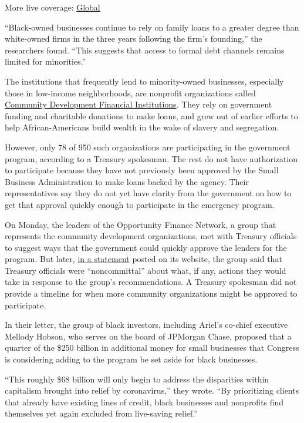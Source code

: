 More live coverage:
\href{https://www.nytimes.com/2020/08/03/world/coronavirus-covid-19.html?action=click\&pgtype=Article\&state=default\&region=MAIN_CONTENT_1\&context=storylines_live_updates}{Global}

``Black-owned businesses continue to rely on family loans to a greater
degree than white-owned firms in the three years following the firm's
founding,'' the researchers found. ``This suggests that access to formal
debt channels remains limited for minorities.''

The institutions that frequently lend to minority-owned businesses,
especially those in low-income neighborhoods, are nonprofit
organizations called
\href{https://www.nytimes.com/2020/06/04/business/minority-businesses-damage-lenders.html}{Community
Development Financial Institutions}. They rely on government funding and
charitable donations to make loans, and grew out of earlier efforts to
help African-Americans build wealth in the wake of slavery and
segregation.

However, only 78 of 950 such organizations are participating in the
government program, according to a Treasury spokesman. The rest do not
have authorization to participate because they have not previously been
approved by the Small Business Administration to make loans backed by
the agency. Their representatives say they do not yet have clarity from
the government on how to get that approval quickly enough to participate
in the emergency program.

On Monday, the leaders of the Opportunity Finance Network, a group that
represents the community development organizations, met with Treasury
officials to suggest ways that the government could quickly approve the
lenders for the program. But later,
\href{https://ofn.org/articles/paycheck-protection-program-update-cdfi-eligibility}{in
a statement} posted on its website, the group said that Treasury
officials were ``noncommittal'' about what, if any, actions they would
take in response to the group's recommendations. A Treasury spokesman
did not provide a timeline for when more community organizations might
be approved to participate.

In their letter, the group of black investors, including Ariel's
co-chief executive Mellody Hobson, who serves on the board of JPMorgan
Chase, proposed that a quarter of the \$250 billion in additional money
for small businesses that Congress is considering adding to the program
be set aside for black businesses.

``This roughly \$68 billion will only begin to address the disparities
within capitalism brought into relief by coronavirus,'' they wrote. ``By
prioritizing clients that already have existing lines of credit, black
businesses and nonprofits find themselves yet again excluded from
live-saving relief.''

